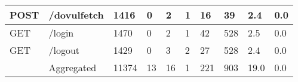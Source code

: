 \begin{table*}[h]
\begin{tabular}{|p{}|p{}|p{}|p{}|p{}|p{}|p{}|p{}|p{}|p{}|}
    POST                                  & /dovulfetch                        & 1416                                      & 0                                      & 2                                          & 1                                      & 16                                     & 39                                                 & 2.4                               & 0.0                                      \\ \hline
    GET                                   & /login                             & 1470                                      & 0                                      & 2                                          & 1                                      & 42                                     & 528                                                & 2.5                               & 0.0                                      \\ \hline
    GET                                   & /logout                            & 1429                                      & 0                                      & 3                                          & 2                                      & 27                                     & 528                                                & 2.4                               & 0.0                                      \\ \hline
                                          & Aggregated                         & 11374                                     & 13                                     & 16                                         & 1                                      & 221                                    & 903                                                & 19.0                              & 0.0                                      \\ \hline
    \end{tabular}
  \end{table*}